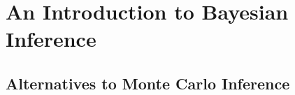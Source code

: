 
\chapter{An Introduction to Bayesian Inference}
\label{chp:inf}





\section{Alternatives to Monte Carlo Inference}